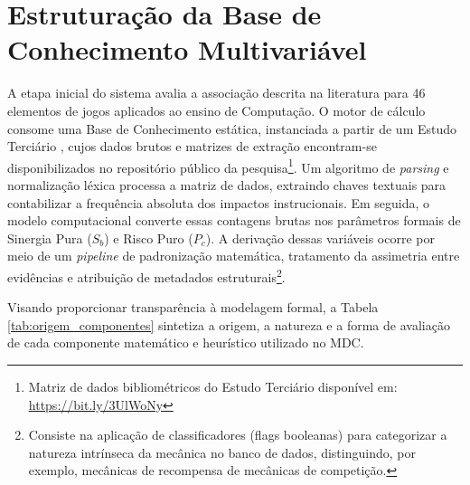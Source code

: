 \section{Estruturação da Base de Conhecimento Multivariável}

A etapa inicial do sistema avalia a associação descrita na literatura para 46 elementos de jogos aplicados ao ensino de Computação. O motor de cálculo consome uma Base de Conhecimento estática, instanciada a partir de um Estudo Terciário \cite{terciario2023}, cujos dados brutos e matrizes de extração encontram-se disponibilizados no repositório público da pesquisa\footnote{Matriz de dados bibliométricos do Estudo Terciário disponível em: \url{https://bit.ly/3UlWoNy}}. Um algoritmo de \textit{parsing} e normalização léxica processa a matriz de dados, extraindo chaves textuais para contabilizar a frequência absoluta dos impactos instrucionais. Em seguida, o modelo computacional converte essas contagens brutas nos parâmetros formais de Sinergia Pura ($S_b$) e Risco Puro ($P_c$). A derivação dessas variáveis ocorre por meio de um \textit{pipeline} de padronização matemática, tratamento da assimetria entre evidências e atribuição de metadados estruturais\footnote{Consiste na aplicação de classificadores (flags booleanas) para categorizar a natureza intrínseca da mecânica no banco de dados, distinguindo, por exemplo, mecânicas de recompensa de mecânicas de competição.}.

Visando proporcionar transparência à modelagem formal, a Tabela \ref{tab:origem_componentes} sintetiza a origem, a natureza e a forma de avaliação de cada componente matemático e heurístico utilizado no MDC.

